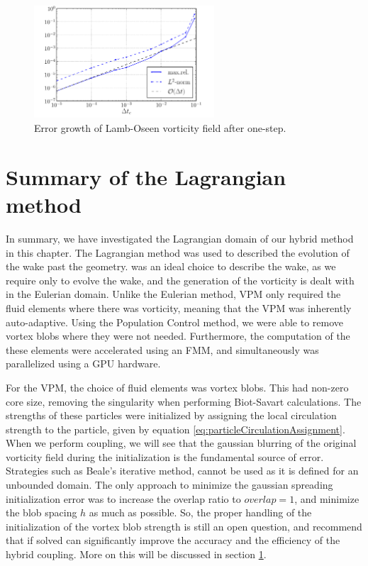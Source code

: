 	\begin{figure}[!b]
	\centering
	\includegraphics[width=0.6\textwidth]{figures/lagrangian/lambOseen_convergence_dt_compressed.pdf}
	\caption{Error growth of Lamb-Oseen vorticity field after one-step.}
	\label{fig:lambOseen_convergence_dt_compressed}
	\end{figure}


\section{Summary of the Lagrangian method}

In summary, we have investigated the Lagrangian domain of our hybrid method in this chapter. The Lagrangian method was used to described the evolution of the wake past the geometry.  was an ideal choice to describe the wake, as we require only to evolve the wake, and the generation of the vorticity is dealt with in the Eulerian domain. Unlike the Eulerian method, VPM only required the fluid elements where there was vorticity, meaning that the VPM was inherently auto-adaptive. Using the Population Control method, we were able to remove vortex blobs where they were not needed. Furthermore, the computation of the these elements were accelerated using an FMM, and simultaneously was parallelized using a GPU hardware. 

For the VPM, the choice of fluid elements was vortex blobs. This had non-zero core size, removing the singularity when performing Biot-Savart calculations. The strengths of these particles were initialized by assigning the local circulation strength to the particle, given by equation \ref{eq:particleCirculationAssignment}. When we perform coupling, we will see that the gaussian blurring of the original vorticity field during the initialization is the fundamental source of error. Strategies such as Beale's iterative method, cannot be used as it is defined for an unbounded domain. The only approach to minimize the gaussian spreading initialization error was to increase the overlap ratio to $overlap=1$, and minimize the blob spacing $h$ as much as possible. So, the proper handling of the initialization of the vortex blob strength is still an open question, and recommend that if solved can significantly improve the accuracy and the efficiency of the hybrid coupling. More on this will be discussed in section \ref{}. 

